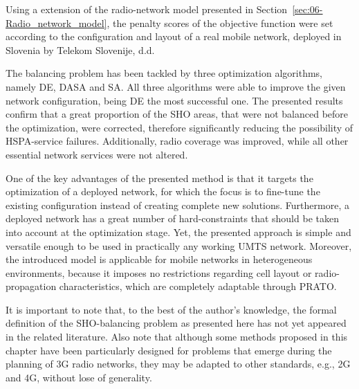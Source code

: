 \noindent Using a extension of the radio-network model presented in
Section~\ref{sec:06-Radio_network_model}, the penalty scores of
the objective function were set according to the configuration and
layout of a real mobile network, deployed in Slovenia by Telekom Slovenije,
d.d. 

The balancing problem has been tackled by three optimization algorithms,
namely DE, DASA and SA. All three algorithms were able to improve
the given network configuration, being DE the most successful one.
The presented results confirm that a great proportion of the SHO areas,
that were not balanced before the optimization, were corrected, therefore
significantly reducing the possibility of HSPA-service failures. Additionally,
radio coverage was improved, while all other essential network services
were not altered.

One of the key advantages of the presented method is that it targets
the optimization of a deployed network, for which the focus is to
fine-tune the existing configuration instead of creating complete
new solutions. Furthermore, a deployed network has a great number
of hard-constraints that should be taken into account at the optimization
stage. Yet, the presented approach is simple and versatile enough
to be used in practically any working UMTS network. Moreover, the
introduced model is applicable for mobile networks in heterogeneous
environments, because it imposes no restrictions regarding cell layout
or radio-propagation characteristics, which are completely adaptable
through PRATO.

It is important to note that, to the best of the author's knowledge,
the formal definition of the SHO-balancing problem as presented here
has not yet appeared in the related literature. Also note that although
some methods proposed in this chapter have been particularly designed
for problems that emerge during the planning of 3G radio networks,
they may be adapted to other standards, e.g., 2G and 4G, without lose
of generality.
